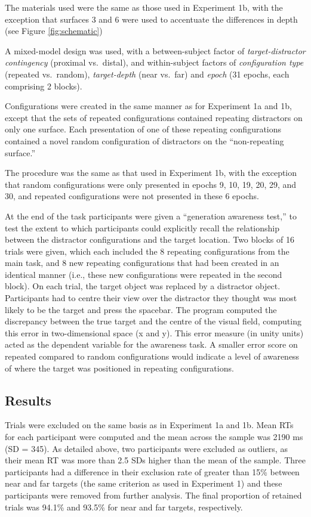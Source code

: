 \documentclass[
  english,
  man,floatsintext]{apa7}
\begin{document}
The materials used were the same as those used in Experiment 1b, with the exception that surfaces 3 and 6 were used to accentuate the differences in depth (see Figure \ref{fig:schematic})

A mixed-model design was used, with a between-subject factor of \emph{target-distractor contingency} (proximal vs.~distal), and within-subject factors of \emph{configuration type} (repeated vs.~random), \emph{target-depth} (near vs.~far) and \emph{epoch} (31 epochs, each comprising 2 blocks).

Configurations were created in the same manner as for Experiment 1a and 1b, except that the sets of repeated configurations contained repeating distractors on only one surface. Each presentation of one of these repeating configurations contained a novel random configuration of distractors on the ``non-repeating surface.''

The procedure was the same as that used in Experiment 1b, with the exception that random configurations were only presented in epochs 9, 10, 19, 20, 29, and 30, and repeated configurations were not presented in these 6 epochs.

At the end of the task participants were given a ``generation awareness test,'' to test the extent to which participants could explicitly recall the relationship between the distractor configurations and the target location. Two blocks of 16 trials were given, which each included the 8 repeating configurations from the main task, and 8 new repeating configurations that had been created in an identical manner (i.e., these new configurations were repeated in the second block). On each trial, the target object was replaced by a distractor object. Participants had to centre their view over the distractor they thought was most likely to be the target and press the spacebar. The program computed the discrepancy between the true target and the centre of the visual field, computing this error in two-dimensional space (x and y). This error measure (in unity units) acted as the dependent variable for the awareness task. A smaller error score on repeated compared to random configurations would indicate a level of awareness of where the target was positioned in repeating configurations.

\hypertarget{results-1}{%
\subsection{Results}\label{results-1}}

Trials were excluded on the same basis as in Experiment 1a and 1b. Mean RTs for each participant were computed and the mean across the sample was 2190 ms (SD = 345). As detailed above, two participants were excluded as outliers, as their mean RT was more than 2.5 SDs higher than the mean of the sample. Three participants had a difference in their exclusion rate of greater than 15\% between near and far targets (the same criterion as used in Experiment 1) and these participants were removed from further analysis. The final proportion of retained trials was 94.1\% and 93.5\% for near and far targets, respectively.
\end{document}
